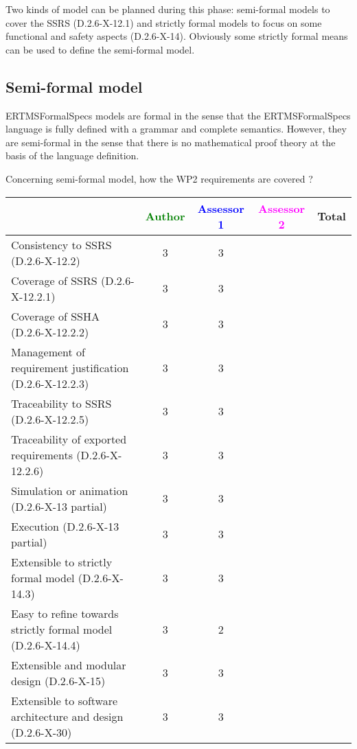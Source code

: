 Two kinds of model can be planned during this phase: semi-formal models to  cover the SSRS (D.2.6-X-12.1) and strictly formal  models to  focus on some functional and safety aspects (D.2.6-X-14). Obviously some strictly  formal means can be used to define the semi-formal  model.

\subsection{Semi-formal model}

\begin{author_comment}
ERTMSFormalSpecs models are formal in the sense that the ERTMSFormalSpecs language is fully defined with a grammar and complete semantics. However, they are semi-formal in the sense that there is no mathematical proof theory at the basis of the language definition.  
\end{author_comment}

Concerning semi-formal model, how the WP2 requirements are covered ?

\begin{tabular}{|l | c | c | c | c|}
\hline
& \textcolor{green}{Author} & \textcolor{blue}{Assessor 1} & \textcolor{magenta}{Assessor 2} & Total \\
\hline 
Consistency to SSRS (D.2.6-X-12.2) & 3 & 3 & &  \\
\hline
Coverage of SSRS (D.2.6-X-12.2.1)  & 3 & 3 & &  \\
\hline
Coverage of SSHA (D.2.6-X-12.2.2)  & 3 & 3 & &  \\
\hline
Management of requirement justification (D.2.6-X-12.2.3)  & 3 & 3 & &  \\
\hline
Traceability to  SSRS (D.2.6-X-12.2.5)  & 3 & 3 & &  \\
\hline
Traceability of exported requirements (D.2.6-X-12.2.6)  & 3 & 3 & &  \\
\hline
Simulation or animation (D.2.6-X-13 partial)  & 3 & 3 & &  \\
\hline
Execution (D.2.6-X-13 partial)  & 3 & 3 & &  \\
\hline
Extensible to strictly formal model (D.2.6-X-14.3) & 3 & 3 & &  \\
\hline
Easy to refine towards strictly formal model (D.2.6-X-14.4) & 3 & 2 & &  \\
\hline
Extensible and modular design (D.2.6-X-15)  & 3 & 3 & &  \\
\hline
Extensible to software architecture and design (D.2.6-X-30)   & 3 & 3 & &  \\
\hline
\end{tabular}


